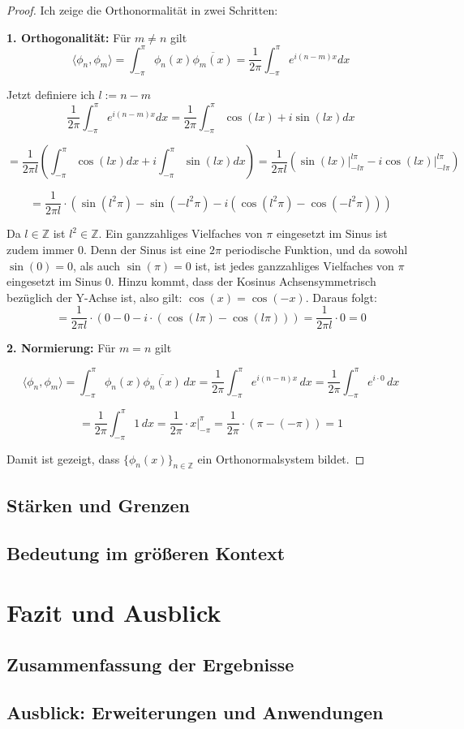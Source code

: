 \documentclass[a4paper,12pt]{article}
\theoremstyle{definition}
\theoremstyle{remark}
\begin{document}
\begin{proof}
Ich zeige die Orthonormalität in zwei Schritten: 

\textbf{1. Orthogonalität:}  
Für $m \neq n$ gilt
$$\langle \phi_n, \phi_m \rangle = \int_{-\pi}^{\pi}{\phi_n(x) \overline{\phi_m(x)}} = \frac{1}{2\pi}\int_{-\pi}^\pi{e^{i(n-m)x}dx}$$

Jetzt definiere ich $l := n-m$
\[\frac{1}{2\pi}\int_{-\pi}^\pi{e^{i(n-m)x}dx} = \frac{1}{2\pi}\int_{-\pi}^\pi{\cos(lx) + i \sin (lx)} dx\] 

\[= \frac{1}{2\pi l}\left(\int_{-\pi}^\pi{\cos (lx) dx} + i\int_{-\pi}^\pi{ \sin (lx) dx} \right)  = \frac{1}{2\pi l} \left(\sin(lx)\big|_{-l\pi}^{l\pi} - i\cos(lx)\big|_{-l\pi}^{l\pi} \right)\]

\[= \frac{1}{2\pi l} \cdot \left(\sin(l^2\pi) - \sin(-l^2\pi) - i\left(\cos(l^2\pi) - \cos(-l^2\pi)\right)\right) \]

Da $l\in \mathbb{Z}$ ist $l^2 \in \mathbb{Z}$. Ein ganzzahliges Vielfaches von $\pi$
eingesetzt im Sinus ist zudem immer 0. Denn der Sinus ist eine $2\pi$ periodische Funktion, und da
sowohl $\sin(0) = 0$, als auch $\sin (\pi) = 0$ ist, ist jedes ganzzahliges Vielfaches von $\pi$ eingesetzt 
im Sinus 0. Hinzu kommt, dass der Kosinus Achsensymmetrisch bezüglich der Y-Achse ist, also gilt:
$\cos (x) =  \cos (-x)$. Daraus folgt:
\[= \frac{1}{2\pi l} \cdot (0 - 0 - i\cdot(\cos(l\pi) - \cos(l\pi))) = \frac{1}{2\pi l} \cdot 0 = 0\]


\textbf{2. Normierung:}  
Für $m = n$ gilt

\[\langle \phi_n, \phi_m \rangle = \int_{-\pi}^{\pi} \phi_n(x) \overline{\phi_n(x)} \, dx = \frac{1}{2\pi} \int_{-\pi}^{\pi} e^{i(n -n) x}\, dx = \frac{1}{2\pi} \int_{-\pi}^{\pi} e^{i\cdot0} \, dx\]

\[= \frac{1}{2\pi} \int_{-\pi}^{\pi} 1 \, dx = \frac{1}{2\pi} \cdot x \Big|_{-\pi}^{\pi} = \frac{1}{2\pi} \cdot (\pi-(-\pi)) = 1\]



Damit ist gezeigt, dass $\{\phi_n(x)\}_{n\in\mathbb{Z}}$ ein Orthonormalsystem bildet.
\end{proof}
\subsection{Stärken und Grenzen}
\subsection{Bedeutung im größeren Kontext}

\section{Fazit und Ausblick}
\subsection{Zusammenfassung der Ergebnisse}
\subsection{Ausblick: Erweiterungen und Anwendungen}
\end{document}
